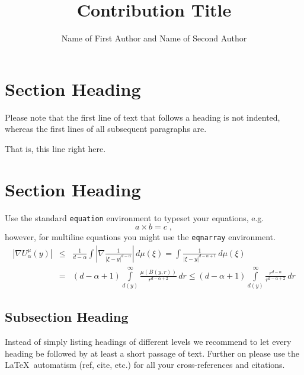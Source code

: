 \begin{bibunit}

\title*{Contribution Title}
\author{Name of First Author and Name of Second Author}
\maketitle


\section{Section Heading}\label{01:section:1}

Please note that the first line of text that follows a heading is not indented, whereas the first lines of all subsequent paragraphs are.

That is, this line right here.

\section{Section Heading}\label{01:section:2}

Use the standard \verb|equation| environment to typeset your equations, e.g.
%
\begin{equation}
a \times b = c\;,
\end{equation}
%
however, for multiline equations you might use the \verb|eqnarray| environment.
\begin{eqnarray}
\left|\nabla U_{\alpha}^{\mu}(y)\right| &\le&\frac1{d-\alpha}\int
\left|\nabla\frac1{|\xi-y|^{d-\alpha}}\right|\,d\mu(\xi) =
\int \frac1{|\xi-y|^{d-\alpha+1}} \,d\mu(\xi)  \\
&=&(d-\alpha+1) \int\limits_{d(y)}^\infty
\frac{\mu(B(y,r))}{r^{d-\alpha+2}}\,dr \le (d-\alpha+1)
\int\limits_{d(y)}^\infty \frac{r^{d-\alpha}}{r^{d-\alpha+2}}\,dr
\label{eq:01}
\end{eqnarray}

\subsection{Subsection Heading}\label{01:subsection:2:1}
Instead of simply listing headings of different levels we recommend to let every heading be followed by at least a short passage of text.  Further on please use the \LaTeX\ automatism (ref, cite, etc.) for all your cross-references and citations.\cite{ManuelMazzara.2017}


\end{bibunit}
